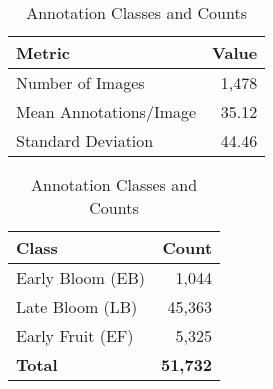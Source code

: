 
\begin{table}[!ht]
\centering
\caption{Dataset summary and annotation counts}
\label{tab:dataset-summary}
\footnotesize
\setlength{\tabcolsep}{6pt}

\begin{subtable}[t]{0.45\linewidth}
\centering
\caption{Annotation Counts Per Image}
\begin{tabular}{lr}
\toprule
\textbf{Metric} & \textbf{Value} \\
\midrule
Number of Images         & 1,478 \\
Mean Annotations/Image   & 35.12 \\
Standard Deviation       & 44.46 \\
\bottomrule
\end{tabular}
\end{subtable}
\hfill
\begin{subtable}[t]{0.45\linewidth}
\centering
\caption{Annotation Classes and Counts}
\begin{tabular}{lr}
\toprule
\textbf{Class} & \textbf{Count} \\
\midrule
Early Bloom (EB)  & 1,044 \\
Late Bloom (LB)   & 45,363 \\
Early Fruit (EF)  & 5,325 \\
\midrule
\textbf{Total}    & \textbf{51,732} \\
\bottomrule
\end{tabular}
\end{subtable}
\end{table}

